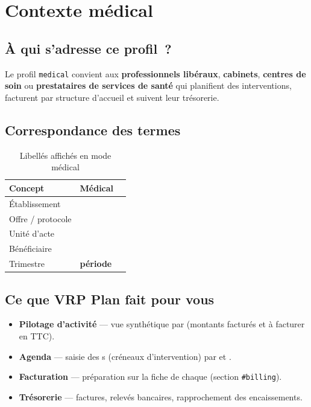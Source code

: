 \section{Contexte médical}
\label{sec:contexte}

\subsection{À qui s'adresse ce profil~?}

Le profil \texttt{medical} convient aux \textbf{professionnels libéraux}, \textbf{cabinets}, \textbf{centres de soin} ou \textbf{prestataires de services de santé} qui planifient des interventions, facturent par structure d'accueil et suivent leur trésorerie.

\subsection{Correspondance des termes}

\begin{table}[htbp]
  \centering
  \caption{Libellés affichés en mode médical}
  \begin{tabular}{@{}lll@{}}
    \toprule
    \textbf{Concept}  & \textbf{Médical} \\
    \midrule
    Établissement         & \structure{} \\
    Offre / protocole  & \prestation{} \\
    Unité d'acte          & \seance{} \\
    Bénéficiaire         & \patient{} \\
    Trimestre          & \textbf{période} \\
  \end{tabular}
\end{table}

\subsection{Ce que VRP Plan fait pour vous}

\begin{itemize}[leftmargin=*]
  \item \textbf{Pilotage d'activité} — vue synthétique par \structure{} (montants facturés et à facturer en TTC).
  \item \textbf{Agenda} — saisie des \seance{}s (créneaux d'intervention) par \structure{} et \patient{}.
  \item \textbf{Facturation} — préparation sur la fiche de chaque \structure{} (section \texttt{\#billing}).
  \item \textbf{Trésorerie} — factures, relevés bancaires, rapprochement des encaissements.
\end{itemize}

